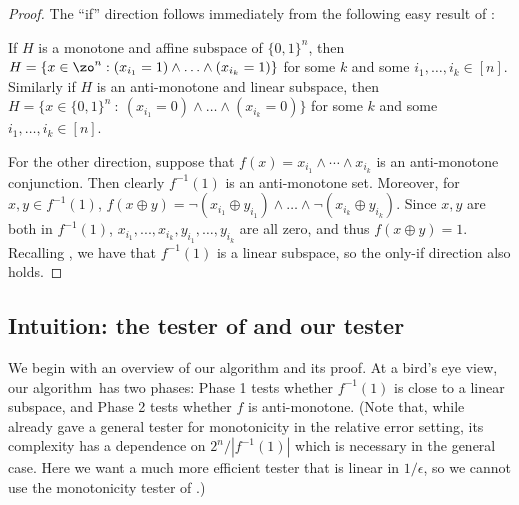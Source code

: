 \documentclass[11pt]{article}
\theoremstyle{definition}
\begin{document}
 
\begin{proof}
The ``if'' direction follows immediately from the following easy result of \cite{PRS02}:
\begin{claim} 
    If $H$ is a monotone and affine subspace of $\{0,1\}^n$, then $H=\{x \in \zo^n : (x_{i_1}=1) \land \ldots \land (x_{i_k} =1) \}$ for some $k$ and some $i_1,\dots,i_k \in [n]$. 
    Similarly if $H$ is an anti-monotone and linear subspace, then 
    $H = \{x \in \{0,1\}^n ~:~(x_{i_1}=0) \land \ldots \land (x_{i_k}=0)\}$ for some $k$ and some $i_1,\ldots,i_k \in [n]$.
\end{claim}



For the other direction, suppose that $f(x)=x_{i_1} \land \cdots \land x_{i_k}$ is an anti-monotone conjunction. Then clearly $f^{-1}(1)$ is an anti-monotone set. Moreover, for $x,y \in f^{-1}(1)$, 
$f(x \oplus y) =  \neg (x_{i_1} \oplus y_{i_1}) \land \ldots \land \neg (x_{i_k} \oplus y_{i_k})$.
Since $x,y$ are both in $f^{-1}(1)$, $x_{i_1},...,x_{i_k},y_{i_1},\ldots,y_{i_k}$ are all zero, and thus $f(x \oplus y)=1$.
Recalling , we have that $f^{-1}(1)$ is a linear subspace, so the only-if direction also holds.
\end{proof}
 
\subsection{Intuition: the tester of \cite{PRS02} and our tester}
\label{sec:conjunction-intuition}





We begin with an overview of our algorithm and its proof.
At a bird's eye view, our algorithm~has two phases: Phase 1  tests whether $f^{-1}(1)$ is close to a linear subspace, and Phase 2 tests whether $f$ is anti-monotone.  
(Note that, while \cite{CDHLNSY2024} already gave a general tester for monotonicity in the relative error setting, its complexity has a dependence on $2^n/|f^{-1}(1)|$ which is necessary in the general case.  Here we want a much more efficient tester that is linear in $1/\epsilon$, so we cannot use the monotonicity tester of \cite{CDHLNSY2024}.)
\end{document}
